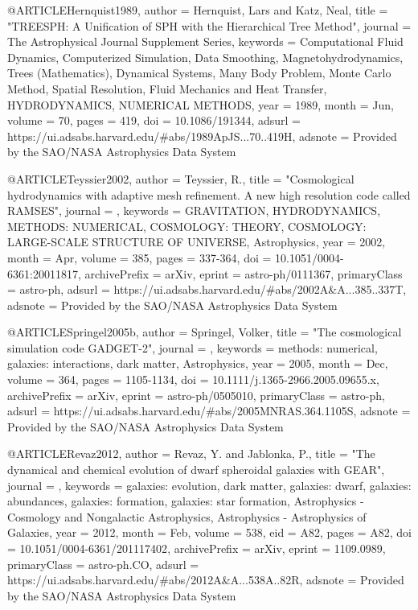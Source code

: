 @ARTICLE{Hernquist1989,
       author = {{Hernquist}, Lars and {Katz}, Neal},
        title = "{TREESPH: A Unification of SPH with the Hierarchical Tree Method}",
      journal = {The Astrophysical Journal Supplement Series},
     keywords = {Computational Fluid Dynamics, Computerized Simulation, Data Smoothing, Magnetohydrodynamics, Trees (Mathematics), Dynamical Systems, Many Body Problem, Monte Carlo Method, Spatial Resolution, Fluid Mechanics and Heat Transfer, HYDRODYNAMICS, NUMERICAL METHODS},
         year = 1989,
        month = Jun,
       volume = {70},
        pages = {419},
          doi = {10.1086/191344},
       adsurl = {https://ui.adsabs.harvard.edu/\#abs/1989ApJS...70..419H},
      adsnote = {Provided by the SAO/NASA Astrophysics Data System}
}

@ARTICLE{Teyssier2002,
       author = {{Teyssier}, R.},
        title = "{Cosmological hydrodynamics with adaptive mesh refinement. A new high resolution code called RAMSES}",
      journal = {\aap},
     keywords = {GRAVITATION, HYDRODYNAMICS, METHODS: NUMERICAL, COSMOLOGY: THEORY, COSMOLOGY: LARGE-SCALE STRUCTURE OF UNIVERSE, Astrophysics},
         year = 2002,
        month = Apr,
       volume = {385},
        pages = {337-364},
          doi = {10.1051/0004-6361:20011817},
archivePrefix = {arXiv},
       eprint = {astro-ph/0111367},
 primaryClass = {astro-ph},
       adsurl = {https://ui.adsabs.harvard.edu/\#abs/2002A&A...385..337T},
      adsnote = {Provided by the SAO/NASA Astrophysics Data System}
}

@ARTICLE{Springel2005b,
       author = {{Springel}, Volker},
        title = "{The cosmological simulation code GADGET-2}",
      journal = {\mnras},
     keywords = {methods: numerical, galaxies: interactions, dark matter, Astrophysics},
         year = 2005,
        month = Dec,
       volume = {364},
        pages = {1105-1134},
          doi = {10.1111/j.1365-2966.2005.09655.x},
archivePrefix = {arXiv},
       eprint = {astro-ph/0505010},
 primaryClass = {astro-ph},
       adsurl = {https://ui.adsabs.harvard.edu/\#abs/2005MNRAS.364.1105S},
      adsnote = {Provided by the SAO/NASA Astrophysics Data System}
}

@ARTICLE{Revaz2012,
       author = {{Revaz}, Y. and {Jablonka}, P.},
        title = "{The dynamical and chemical evolution of dwarf spheroidal galaxies with GEAR}",
      journal = {\aap},
     keywords = {galaxies: evolution, dark matter, galaxies: dwarf, galaxies: abundances, galaxies: formation, galaxies: star formation, Astrophysics - Cosmology and Nongalactic Astrophysics, Astrophysics - Astrophysics of Galaxies},
         year = 2012,
        month = Feb,
       volume = {538},
          eid = {A82},
        pages = {A82},
          doi = {10.1051/0004-6361/201117402},
archivePrefix = {arXiv},
       eprint = {1109.0989},
 primaryClass = {astro-ph.CO},
       adsurl = {https://ui.adsabs.harvard.edu/\#abs/2012A&A...538A..82R},
      adsnote = {Provided by the SAO/NASA Astrophysics Data System}
}

